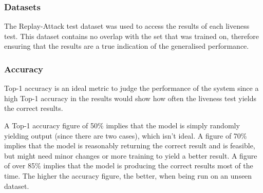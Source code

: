 \documentclass[12pt,a4paper]{article}
\begin{document}
        \subsubsection{Datasets}
            The Replay-Attack test dataset was used to access the results of each liveness test. This dataset contains no overlap with the set that was trained on, therefore ensuring that
            the results are a true indication of the generalised performance.

        \subsubsection{Accuracy}
             Top-1 accuracy is an ideal metric to judge the performance of the system since a high Top-1 accuracy in the results would show how often the liveness test yields the correct results.
            
            A Top-1 accuracy figure of 50\% implies that the model is simply randomly yielding output (since there are two cases), which isn't ideal. A figure of 70\% implies that the model is reasonably returning the correct result and is feasible, but might need minor changes or more training to yield a better result. A figure of over 85\% implies that the model is producing the correct results most of the time. The higher the accuracy figure, the better, when being run on an unseen dataset.
\end{document}

